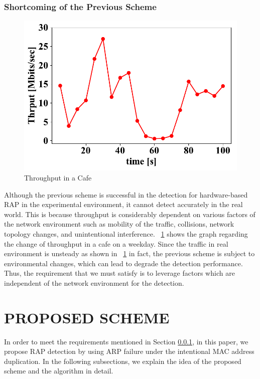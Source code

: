 \documentclass[conference]{IEEEtran}
\begin{document}
\subsubsection{Shortcoming of the Previous Scheme}\label{sec:shortcoming}
\begin{figure}[t]
    \begin{center}
        \includegraphics[scale=0.3]{figure/Thrput.pdf}
        \caption{Throughput in a Cafe}
        \label{thrput}
    \end{center}
    \vspace{-2zh}
\end{figure}
Although the previous scheme is successful in the detection for hardware-based RAP in the experimental environment, it cannot detect accurately in the real world.
This is because throughput is considerably dependent on various factors of the network environment such as mobility of the traffic, collisions, network topology changes, and unintentional interference.
\figurename~\ref{thrput} shows the graph regarding the change of throughput in a cafe on a weekday.
Since the traffic in real environment is unsteady as shown in \figurename~\ref{thrput} in fact, the previous scheme is subject to environmental changes, which can lead to degrade the detection performance.
Thus, the requirement that we must satisfy is to leverage factors which are independent of the network environment for the detection.

\section{PROPOSED SCHEME}\label{sec:4}
In order to meet the requirements mentioned in Section \ref{sec:shortcoming}, in this paper, we propose RAP detection by using ARP failure under the intentional MAC address duplication.
In the following subsections, we explain the idea of the proposed scheme and the algorithm in detail.
\end{document}
